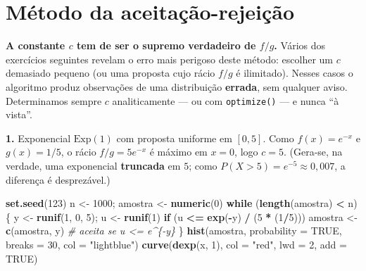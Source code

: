 \documentclass[
  portuguese,
  11pt,
  openany]{book}
\newenvironment{Shaded}{\begin{snugshade}}{\end{snugshade}}
\newcommand{\AttributeTok}[1]{\textcolor[rgb]{0.13,0.29,0.53}{#1}}
\newcommand{\CommentTok}[1]{\textcolor[rgb]{0.56,0.35,0.01}{\textit{#1}}}
\newcommand{\ConstantTok}[1]{\textcolor[rgb]{0.56,0.35,0.01}{#1}}
\newcommand{\ControlFlowTok}[1]{\textcolor[rgb]{0.13,0.29,0.53}{\textbf{#1}}}
\newcommand{\DecValTok}[1]{\textcolor[rgb]{0.00,0.00,0.81}{#1}}
\newcommand{\FunctionTok}[1]{\textcolor[rgb]{0.13,0.29,0.53}{\textbf{#1}}}
\newcommand{\NormalTok}[1]{#1}
\newcommand{\OtherTok}[1]{\textcolor[rgb]{0.56,0.35,0.01}{#1}}
\newcommand{\SpecialCharTok}[1]{\textcolor[rgb]{0.81,0.36,0.00}{\textbf{#1}}}
\newcommand{\StringTok}[1]{\textcolor[rgb]{0.31,0.60,0.02}{#1}}
\begin{document}
\section{Método da aceitação-rejeição}\label{muxe9todo-da-aceitauxe7uxe3o-rejeiuxe7uxe3o}

\textbf{A constante \(c\) tem de ser o supremo verdadeiro de \(f/g\).} Vários dos
exercícios seguintes revelam o erro mais perigoso deste método: escolher um \(c\)
demasiado pequeno (ou uma proposta cujo rácio \(f/g\) é ilimitado). Nesses casos o
algoritmo produz observações de uma distribuição \textbf{errada}, sem qualquer aviso.
Determinamos sempre \(c\) analiticamente --- ou com \texttt{optimize()} --- e nunca ``à vista''.

\textbf{1.} Exponencial \(\text{Exp}(1)\) com proposta uniforme em \([0,5]\). Como
\(f(x) = e^{-x}\) e \(g(x) = 1/5\), o rácio \(f/g = 5e^{-x}\) é máximo em \(x = 0\), logo
\(c = 5\). (Gera-se, na verdade, uma exponencial \textbf{truncada} em \(5\); como
\(P(X > 5) = e^{-5} \approx 0{,}007\), a diferença é desprezável.)

\begin{Shaded}
\begin{Highlighting}[]
\FunctionTok{set.seed}\NormalTok{(}\DecValTok{123}\NormalTok{)}
\NormalTok{n }\OtherTok{\textless{}{-}} \DecValTok{1000}\NormalTok{; amostra }\OtherTok{\textless{}{-}} \FunctionTok{numeric}\NormalTok{(}\DecValTok{0}\NormalTok{)}
\ControlFlowTok{while}\NormalTok{ (}\FunctionTok{length}\NormalTok{(amostra) }\SpecialCharTok{\textless{}}\NormalTok{ n) \{}
\NormalTok{  y }\OtherTok{\textless{}{-}} \FunctionTok{runif}\NormalTok{(}\DecValTok{1}\NormalTok{, }\DecValTok{0}\NormalTok{, }\DecValTok{5}\NormalTok{); u }\OtherTok{\textless{}{-}} \FunctionTok{runif}\NormalTok{(}\DecValTok{1}\NormalTok{)}
  \ControlFlowTok{if}\NormalTok{ (u }\SpecialCharTok{\textless{}=} \FunctionTok{exp}\NormalTok{(}\SpecialCharTok{{-}}\NormalTok{y) }\SpecialCharTok{/}\NormalTok{ (}\DecValTok{5} \SpecialCharTok{*}\NormalTok{ (}\DecValTok{1}\SpecialCharTok{/}\DecValTok{5}\NormalTok{))) amostra }\OtherTok{\textless{}{-}} \FunctionTok{c}\NormalTok{(amostra, y)  }\CommentTok{\# aceita se u \textless{}= e\^{}\{{-}y\}}
\NormalTok{\}}
\FunctionTok{hist}\NormalTok{(amostra, }\AttributeTok{probability =} \ConstantTok{TRUE}\NormalTok{, }\AttributeTok{breaks =} \DecValTok{30}\NormalTok{, }\AttributeTok{col =} \StringTok{"lightblue"}\NormalTok{)}
\FunctionTok{curve}\NormalTok{(}\FunctionTok{dexp}\NormalTok{(x, }\DecValTok{1}\NormalTok{), }\AttributeTok{col =} \StringTok{"red"}\NormalTok{, }\AttributeTok{lwd =} \DecValTok{2}\NormalTok{, }\AttributeTok{add =} \ConstantTok{TRUE}\NormalTok{)}
\end{Highlighting}
\end{Shaded}
\end{document}

